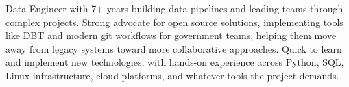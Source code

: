 
\begin{cvparagraph}
Data Engineer with 7+ years building data pipelines and leading teams through complex projects. Strong advocate for open source solutions, implementing tools like DBT and modern git workflows for government teams, helping them move away from legacy systems toward more collaborative approaches. Quick to learn and implement new technologies, with hands-on experience across Python, SQL, Linux infrastructure, cloud platforms, and whatever tools the project demands.
\end{cvparagraph}